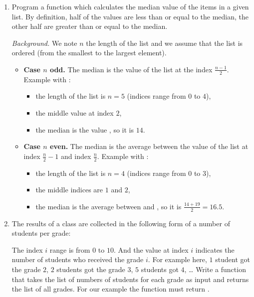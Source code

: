 \documentclass[11pt,class=report,crop=false]{standalone}
\begin{document}
\begin{activite}


\begin{enumerate}
  \item Program a function  which calculates the median value of the items in a given list. By definition, half of the values are less than or equal to the median, the other half are greater than or equal to the median.

  \emph{Background.} We note $n$ the length of the list and we assume that the list is ordered (from the smallest to the largest element).
  \begin{itemize}
    \item \textbf{Case $n$ odd.} The median is the value of the list at the index $\frac{n-1}{2}$.    
    Example with :
    \begin{itemize}
      \item the length of the list is $n=5$ (indices range from $0$ to $4$),
      \item the middle value at index $2$,
      \item the median is the value , so it is $14$.
    \end{itemize}
    
    \item \textbf{Case $n$ even.} The median is the average between the value of the list at index $\frac{n}{2}-1$ and index $\frac{n}{2}$.
    Example with :
    \begin{itemize}
      \item the length of the list is $n=4$ (indices range from $0$ to $3$),
      \item the middle indices are $1$ and $2$,
      \item the median is the average between  and , so it is $\frac{14+19}{2} = 16.5$.
    \end{itemize}    
   \end{itemize} 
   
   
   
     
    \item The results of a class are collected in the following form of a number of students per grade:   
    
    The index $i$ range is from $0$ to $10$. And the value at index $i$ indicates the number of students who received the grade $i$.
    For example here, $1$ student got the grade $2$, $2$ students got the grade $3$, $5$ students got $4$, \ldots{}  
    Write a  function that takes the list of numbers of students for each grade as input and returns the list of all grades. For our example the function must return \ci{[2,3,3,4,4,4,4,4,5,5,6,6,6,7,...]}.


\end{enumerate}
\end{activite}
\end{document}
